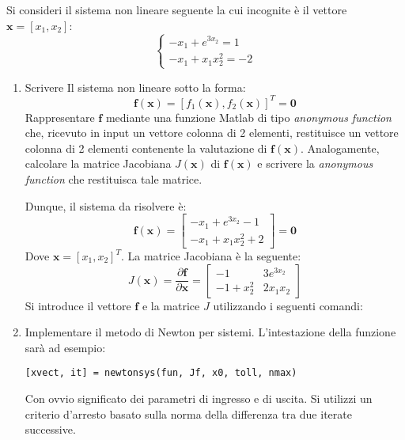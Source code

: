 Si consideri il sistema non lineare seguente la cui incognite è il vettore $\mathbf{x} = \left[x_{1}, x_{2}\right]$:
\begin{equation*}
	\begin{cases}
		-x_{1} + e^{3x_{2}} = 1 \\
		-x_{1} + x_{1}x_{2}^{2} = -2
	\end{cases}
\end{equation*}
\begin{enumerate}
	\item Scrivere Il sistema non lineare sotto la forma:
	\begin{equation*}
		\mathbf{f}\left(\mathbf{x}\right) = \left[f_{1}\left(\mathbf{x}\right), f_{2}\left(\mathbf{x}\right)\right]^{T} = \mathbf{0}
	\end{equation*}
	Rappresentare $\mathbf{f}$ mediante una funzione Matlab di tipo \emph{anonymous function} che, ricevuto in input un vettore colonna di 2 elementi, restituisce un vettore colonna di 2 elementi contenente la valutazione di $\mathbf{f}\left(\mathbf{x}\right)$. Analogamente, calcolare la matrice Jacobiana $J\left(\mathbf{x}\right)$ di $\mathbf{f}\left(\mathbf{x}\right)$ e scrivere la \emph{anonymous function} che restituisca tale matrice.
	
	Dunque, il sistema da risolvere è:
	\begin{equation*}
		\mathbf{f}\left(\mathbf{x}\right) = \begin{bmatrix}
			-x_{1} + e^{3x_{2}}-1 \\
			-x_{1} + x_{1}x_{2}^{2} + 2
		\end{bmatrix} = \mathbf{0}
	\end{equation*}
	Dove $\mathbf{x} = \left[x_{1}, x_{2}\right]^{T}$. La matrice Jacobiana è la seguente:
	\begin{equation*}
		J\left(\mathbf{x}\right) = \dfrac{\partial \mathbf{f}}{\partial \mathbf{x}} = \begin{bmatrix}
			-1 & 3e^{3x_{2}} \\
			-1+x_{2}^{2} & 2x_{1}x_{2}
		\end{bmatrix}
	\end{equation*}
	Si introduce il vettore $\mathbf{f}$ e la matrice $J$ utilizzando i seguenti comandi:
	
	
	
	\item Implementare il metodo di Newton per sistemi. L'intestazione della funzione sarà ad esempio:
	\begin{center}
		\texttt{[xvect, it] = newtonsys(fun, Jf, x0, toll, nmax)}
	\end{center}
	Con ovvio significato dei parametri di ingresso e di uscita. Si utilizzi un criterio d'arresto basato sulla norma della differenza tra due iterate successive.
	

\end{enumerate}
